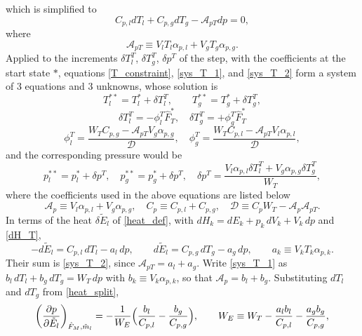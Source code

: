 which is simplified to
\begin{equation}\label{sys_T_2}
C_{p,l} dT_l + C_{p,g} dT_g - \mathcal{A}_{pT} dp = 0,
\end{equation}
where
\begin{equation}
\mathcal{A}_{pT} \equiv V_l T_l \alpha_{p,l} + V_g T_g \alpha_{p,g}.
\end{equation}
Applied to the increments $\delta T_l^T$, $\delta T_g^T$, $\delta p^T$ of the step, with the coefficients at the start state $*$, equations \eqref{T_constraint}, \eqref{sys_T_1}, and \eqref{sys_T_2} form a system of 3 equations and 3 unknowns, whose solution is
\begin{equation}
T_l^{**} = T_l^* + \delta T_l^T,\qquad T_g^{**} = T_g^* + \delta T_g^T,
\end{equation}
\begin{equation}
\delta T_l^T = -\phi_l^T \hat{F}_T^*, \quad \delta T_g^T = +\phi_g^T \hat{F}_T^* 
\end{equation}
\begin{equation}\label{phi_T}
\phi_l^T =\frac{W_TC_{p,g} - \mathcal{A}_{pT}V_g\alpha_{p,g}}{\mathcal{D}}, \quad \phi_g^T = \frac{W_TC_{p,l} - \mathcal{A}_{pT}V_l\alpha_{p,l}}{\mathcal{D}},
\end{equation}
and the corresponding pressure would be
\begin{equation}
p_l^{**} = p_l^*+\delta p^T, \quad p_g^{**} = p_g^*+\delta p^T, \quad \delta p^T = \frac{V_l\alpha_{p,l}\delta T_l^T+V_g\alpha_{p,g}\delta T_g^T}{W_T},
\end{equation}
where the coefficients used in the above equations are listed below
\begin{equation}
\mathcal{A}_p \equiv V_l \alpha_{p,l} + V_g \alpha_{p,g}, \quad C_p \equiv C_{p,l}+C_{p,g}, \quad \mathcal{D} \equiv C_pW_T-\mathcal{A}_p\mathcal{A}_{pT}.
\end{equation}
In terms of the heat $\delta\tilde{E}_l$ of \eqref{heat_def}, with $dH_k=dE_k+p_k\,dV_k+V_k\,dp$ and \eqref{dH_T},
\begin{equation}\label{heat_split}
-d\tilde{E}_l=C_{p,l}\,dT_l-a_l\,dp,\qquad d\tilde{E}_l=C_{p,g}\,dT_g-a_g\,dp,\qquad a_k\equiv V_kT_k\alpha_{p,k}.
\end{equation}
Their sum is \eqref{sys_T_2}, since $\mathcal{A}_{pT}=a_l+a_g$. Write \eqref{sys_T_1} as $b_l\,dT_l+b_g\,dT_g=W_T\,dp$ with $b_k\equiv V_k\alpha_{p,k}$, so that $\mathcal{A}_p=b_l+b_g$. Substituting $dT_l$ and $dT_g$ from \eqref{heat_split},
\begin{equation}\label{dp_dQ}
\left(\frac{\partial p}{\partial\tilde{E}_l}\right)_{\hat{F}_M,\tilde{m}_l}=-\frac1{W_E}\Bigl(\frac{b_l}{C_{p,l}}-\frac{b_g}{C_{p,g}}\Bigr),\qquad
W_E\equiv W_T-\frac{a_lb_l}{C_{p,l}}-\frac{a_gb_g}{C_{p,g}},
\end{equation}
